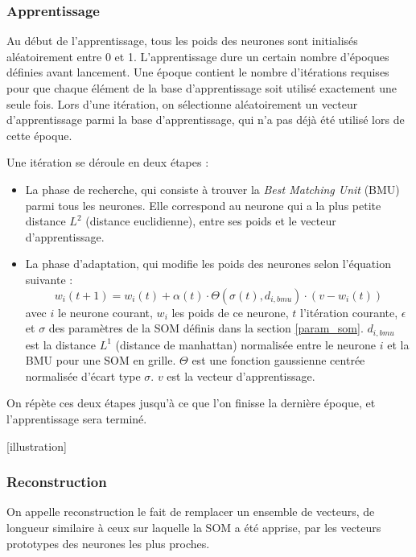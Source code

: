 \subsubsection{Apprentissage}

	Au début de l'apprentissage, tous les poids des neurones sont initialisés aléatoirement entre 0 et 1. L'apprentissage dure un certain nombre d'époques définies avant lancement. Une époque contient le nombre d'itérations requises pour que chaque élément de la base d'apprentissage soit utilisé exactement une seule fois. Lors d'une itération, on sélectionne aléatoirement un vecteur d'apprentissage parmi la base d'apprentissage, qui n'a pas déjà été utilisé lors de cette époque. 

	Une itération se déroule en deux étapes : 
	\begin{itemize}
		\item La phase de recherche, qui consiste à trouver la \textit{Best Matching Unit} (BMU) parmi tous les neurones. Elle correspond au neurone qui a la plus petite distance $L^2$ (distance euclidienne), entre ses poids et le vecteur d'apprentissage.
		\item La phase d'adaptation, qui modifie les poids des neurones selon l'équation suivante :
		\begin{equation}\label{eq:SOM}
			w_i(t+1) = w_i(t)+\alpha(t)\cdot\Theta(\sigma(t),d_{i,bmu})\cdot(v-w_i(t))
		\end{equation} avec $i$ le neurone courant, $w_i$ les poids de ce neurone, $t$ l'itération courante, $\epsilon$ et $\sigma$ des paramètres de la SOM définis dans la section \ref{param_som}. $d_{i, bmu}$ est la distance $L^1$ (distance de manhattan) normalisée entre le neurone $i$ et la BMU pour une SOM en grille. $\Theta$ est une fonction gaussienne centrée normalisée d'écart type $\sigma$. $v$ est la vecteur d'apprentissage.
	\end{itemize}

	On répète ces deux étapes jusqu'à ce que l'on finisse la dernière époque, et l'apprentissage sera terminé.

	[illustration]

\subsubsection{Reconstruction}
	
	On appelle reconstruction le fait de remplacer un ensemble de vecteurs, de longueur similaire à ceux sur laquelle la SOM a été apprise, par les vecteurs prototypes des neurones les plus proches.

